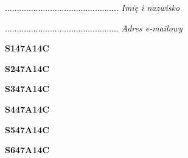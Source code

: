 \begin{turn}{90}\begin{minipage}{\linewidth} \vspace{20mm} ................................................  \textit{Imię i nazwisko}\end{minipage}\end{turn}

\begin{turn}{90}\begin{minipage}{\linewidth} \vspace{20mm} ................................................  \textit{Adres e-mailowy}\end{minipage}\end{turn}

\begin{turn}{90}\huge \begin{minipage}{\linewidth} \vspace{10mm}\textbf{S147A14C}\end{minipage}\end{turn}

\begin{turn}{90}\huge \begin{minipage}{\linewidth} \vspace{10mm}\textbf{S247A14C}\end{minipage}\end{turn}

\begin{turn}{90}\huge \begin{minipage}{\linewidth} \vspace{10mm}\textbf{S347A14C}\end{minipage}\end{turn}

\begin{turn}{90}\huge \begin{minipage}{\linewidth} \vspace{10mm}\textbf{S447A14C}\end{minipage}\end{turn}

\begin{turn}{90}\huge \begin{minipage}{\linewidth} \vspace{10mm}\textbf{S547A14C}\end{minipage}\end{turn}

\begin{turn}{90}\huge \begin{minipage}{\linewidth} \vspace{10mm}\textbf{S647A14C}\end{minipage}\end{turn}

